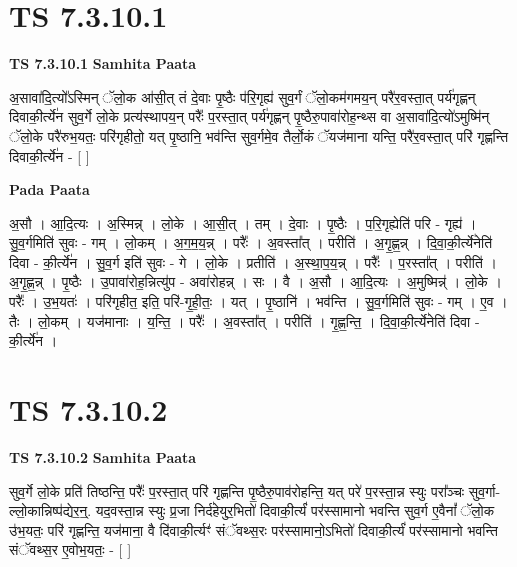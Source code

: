 \documentclass[17pt]{extarticle}
\begin{document}
\section*{ TS 7.3.10.1 }

\textbf{TS 7.3.10.1 } \newline
\textbf{Samhita Paata} \newline

अ॒सावा॑दि॒त्यो᳚ऽस्मिन् ॅलो॒क आ॑सी॒त् तं दे॒वाः पृ॒ष्ठैः प॑रि॒गृह्य॑ सुव॒र्गं ॅलो॒कम॑गमय॒न् परै॑र॒वस्ता॒त् पर्य॑गृह्णन् दिवाकी॒र्त्ये॑न सुव॒र्गे लो॒के प्रत्य॑स्थापय॒न् परैः᳚ प॒रस्ता॒त् पर्य॑गृह्णन् पृ॒ष्ठैरु॒पावा॑रोह॒न्थ्स वा अ॒सावा॑दि॒त्यो॑ऽमुष्मि॑न् ॅलो॒के परै॑रुभ॒यतः॒ परि॑गृहीतो॒ यत् पृ॒ष्ठानि॒ भव॑न्ति सुव॒र्गमे॒व तैर्लो॒कं ॅयज॑माना यन्ति॒ परै॑र॒वस्ता॒त् परि॑ गृह्णन्ति दिवाकी॒र्त्ये॑न - [  ] \newline

\textbf{Pada Paata} \newline

अ॒सौ । आ॒दि॒त्यः । अ॒स्मिन्न् । लो॒के । आ॒सी॒त् । तम् । दे॒वाः । पृ॒ष्ठैः । प॒रि॒गृह्येति॑ परि - गृह्य॑ । सु॒व॒र्गमिति॑ सुवः - गम् । लो॒कम् । अ॒ग॒म॒य॒न्न् । परैः᳚ । अ॒वस्ता᳚त् । परीति॑ । अ॒गृ॒ह्ण॒न्न् । दि॒वा॒की॒र्त्ये॑नेति॑ दिवा - की॒र्त्ये॑न । सु॒व॒र्ग इति॑ सुवः - गे । लो॒के । प्रतीति॑ । अ॒स्था॒प॒य॒न्न् । परैः᳚ । प॒रस्ता᳚त् । परीति॑ । अ॒गृ॒ह्ण॒न्न् । पृ॒ष्ठैः । उ॒पावा॑रोह॒न्नित्यु॑प - अवा॑रोहन्न् । सः । वै । अ॒सौ । आ॒दि॒त्यः । अ॒मुष्मिन्न्॑ । लो॒के । परैः᳚ । उ॒भ॒यतः॑ । परि॑गृहीत॒ इति॒ परि॑-गृ॒ही॒तः॒ । यत् । पृ॒ष्ठानि॑ । भव॑न्ति । सु॒व॒र्गमिति॑ सुवः - गम् । ए॒व । तैः । लो॒कम् । यज॑मानाः । य॒न्ति॒ । परैः᳚ । अ॒वस्ता᳚त् । परीति॑ । गृ॒ह्ण॒न्ति॒ । दि॒वा॒की॒र्त्ये॑नेति॑ दिवा - की॒र्त्ये॑न ।  \newline




\section*{ TS 7.3.10.2 }

\textbf{TS 7.3.10.2 } \newline
\textbf{Samhita Paata} \newline

सुव॒र्गे लो॒के प्रति॑ तिष्ठन्ति॒ परैः᳚ प॒रस्ता॒त् परि॑ गृह्णन्ति पृ॒ष्ठैरु॒पाव॑रोहन्ति॒ यत् परे॑ प॒रस्ता॒न्न स्युः परा᳚ञ्चः सुव॒र्गा-ल्लो॒कान्निष्प॑द्येर॒न्॒. यद॒वस्ता॒न्न स्युः प्र॒जा निर्द॑हेयुर॒भितो॑ दिवाकी॒र्त्यं॑ पर॑स्सामानो भवन्ति सुव॒र्ग ए॒वैनां᳚ ॅलो॒क उ॑भ॒यतः॒ परि॑ गृह्णन्ति॒ यज॑माना॒ वै दि॑वाकी॒र्त्यꣳ॑ संॅवथ्स॒रः पर॑स्सामानो॒ऽभितो॑ दिवाकी॒र्त्यं॑ पर॑स्सामानो भवन्ति संॅवथ्स॒र ए॒वोभ॒यतः॒ - [  ] \newline
\end{document}
